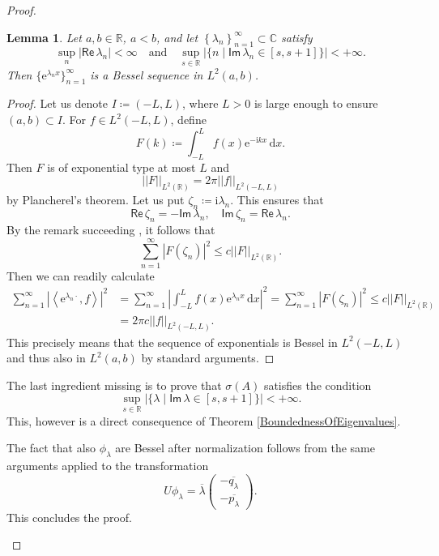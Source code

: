 \documentclass[11pt, a4paper,reqno]{amsart}
\theoremstyle{plain}
\newtheorem{lemma}[theorem]{Lemma}
\theoremstyle{definition}
\theoremstyle{remark}
\newcommand{\inner}[2]{\left\langle{#1}, {#2}\right\rangle}
\newcommand{\seq}[1]{\left\{#1_n\right\}_{n = 1}^{\infty}}
\newcommand{\dd}{\,\textrm{d}}
\newcommand{\norm}[1]{\left|\left|#1\right|\right|}
\renewcommand{\leq}{\leqslant}	\renewcommand{\geq}{\geqslant}
\newcommand{\1}{\mathds 1}
\renewcommand{\Re}{\mathsf{Re}\,}
\renewcommand{\Im}{\mathsf{Im}\,}
\begin{document}
\begin{proof}
\begin{enumerate}
        \begin{lemma}
            Let $a, b \in \mathbb R$, $a<b$, and let $\seq{\lambda} \subset \mathbb C$ satisfy
            \[
            \sup_n|\Re \lambda_n| < \infty \quad \text{and} \quad \sup_{s \in \mathbb R} \left|\{n \mid \Im \lambda_n \in [s, s+1] \}\right| < +\infty.
            \]
            Then $\{\mathrm{e}^{\lambda_n x}\}_{n=1}^\infty$ is a Bessel sequence in $L^2(a, b)$.
        \end{lemma}
        \begin{proof}
            Let us denote $I \coloneqq (-L, L)$, where $L > 0$ is large enough to ensure $(a, b) \subset I$. For $f \in L^2(-L, L)$, define
            \[
            F(k) \coloneqq \int_{-L}^L f(x) \mathrm{e}^{-\mathrm{i}kx}\dd x.
            \]
            Then $F$ is of exponential type at most $L$ and
            \[ 
            \norm{F}_{L^2(\mathbb R)} = 2\pi \norm{f}_{L^2(-L,L)}
            \]
            by Plancherel's theorem.
            Let us put $\zeta_n \coloneqq \mathrm{i}\lambda_n$. This ensures that
            \[
            \Re \zeta_n = -\Im\lambda_n, \quad \Im \zeta_n = \Re \lambda_n.
            \]
            By the remark succeeding \cite[Theorem 2.3.17]{Young}, it follows that
            \[
            \sum_{n=1}^\infty |F(\zeta_n)|^2 \leq c\norm{F}_{L^2(\mathbb R)}.
            \]
            Then we can readily calculate
            \begin{align*}
                \sum_{n=1}^\infty\left|\inner{\mathrm{e}^{\lambda_n\cdot}}{f}\right|^2 &= \sum_{n=1}^\infty \left|\int_{-L}^Lf(x)\mathrm{e}^{\lambda_n x}\dd x\right|^2 = \sum_{n=1}^\infty\left|F(\zeta_n)\right|^2 \leq c \norm{F}_{L^2(\mathbb R)} \\&= 2\pi c\norm{f}_{L^2(-L,L)}.
            \end{align*}
            This precisely means that the sequence of exponentials is Bessel in $L^2(-L, L)$ and thus also in $L^2(a, b)$ by standard arguments.
        \end{proof}
        The last ingredient missing is to prove that $\sigma(A)$ satisfies the condition 
        \[
        \sup_{s\in\mathbb R}\left|\{\lambda \mid \Im \lambda \in [s, s+1] \}\right| < +\infty.
        \]
        This, however is a direct consequence of Theorem \ref{BoundednessOfEigenvalues}.

        The fact that also $\phi_\lambda$ are Bessel after normalization follows from the same arguments applied to the transformation
        \[
        U\phi_\lambda = \overline{\lambda}\begin{pmatrix}
            -\overline{q_\lambda} \\ -\overline{p_\lambda}
        \end{pmatrix}.
        \]
        This concludes the proof. \qedhere
 \end{enumerate}
\end{proof}
\end{document}
